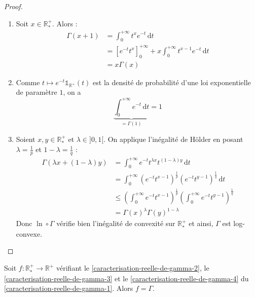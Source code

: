   \begin{proof}
    \begin{enumerate}[label=(\roman*)]
      \item Soit $x \in \mathbb{R}^+_*$. Alors :
      \begin{align*}
        \Gamma(x+1) &= \int_0^{+\infty} t^x e^{-t} \, \mathrm{d}t \\
        &= \left[ e^{-t} t^x \right]_0^{+\infty} + x \int_0^{+\infty} t^{x-1} e^{-t} \, \mathrm{d}t \\
        &= x\Gamma(x)
      \end{align*}
      \item Comme $t \mapsto e^{-t} \mathbb{1}_{\mathbb{R}^+}(t)$ est la densité de probabilité d'une loi exponentielle de paramètre $1$, on a
      \[ \underbrace{\int_0^{+\infty} e^{-t} \, \mathrm{d}t}_{= \Gamma(1)} = 1 \]
      \item Soient $x, y \in \mathbb{R}^+_*$ et $\lambda \in ]0, 1[$. On applique l'inégalité de Hölder en posant $\lambda = \frac{1}{p}$ et $1-\lambda = \frac{1}{q}$ :
      \begin{align*}
        \Gamma(\lambda x + (1-\lambda) y) &= \int_0^{+\infty} e^{-t} t^{\lambda x} t^{(1-\lambda)y} \, \mathrm{d}t \\
        &= \int_0^{+\infty} (e^{-t} t^{x-1})^{\frac{1}{p}} (e^{-t} t^{y-1})^{\frac{1}{q}} \, \mathrm{d}t \\
        &\leq \left (\int_0^{+\infty} e^{-t} t^{x-1} \right)^{\frac{1}{p}} \left (\int_0^{+\infty} e^{-t} t^{y-1} \right)^{\frac{1}{q}} \\
        &= \Gamma(x)^\lambda \Gamma(y)^{1-\lambda}
      \end{align*}
      Donc $\ln \circ \Gamma$ vérifie bien l'inégalité de convexité sur $\mathbb{R}^+_*$ et ainsi, $\Gamma$ est log-convexe.
    \end{enumerate}
  \end{proof}

  \begin{theorem}
    Soit $f : \mathbb{R}^+_* \rightarrow \mathbb{R}^+$ vérifiant le \cref{caracterisation-reelle-de-gamma-2}, le \cref{caracterisation-reelle-de-gamma-3} et le \cref{caracterisation-reelle-de-gamma-4} du \cref{caracterisation-reelle-de-gamma-1}. Alors $f = \Gamma$.
  \end{theorem}

